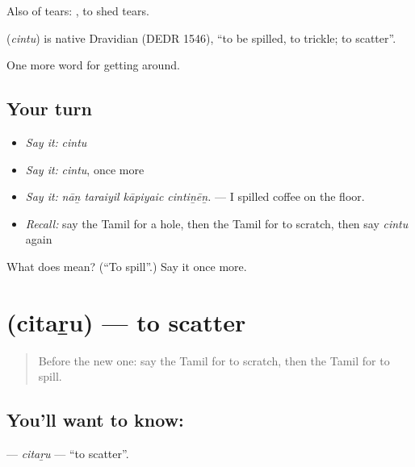 Also of tears:  , to shed tears.

\begin{cousinweb}
\textbf{} (\emph{cintu}) is native Dravidian (DEDR 1546), \textquotedblleft{}to be spilled, to trickle; to scatter\textquotedblright{}.
\end{cousinweb}

\begin{grammarlens}[title={What you've built}]
One more word for getting around.
\end{grammarlens}

\subsection*{Your turn}
\begin{itemize}
\raggedright
  \item \emph{Say it:} \emph{cintu}
  \item \emph{Say it:} \emph{cintu}, once more
  \item \emph{Say it:} \emph{nāṉ taraiyil kāpiyaic cintiṉēṉ.} — I spilled coffee on the floor.
  \item \emph{Recall:} say the Tamil for a hole, then the Tamil for to scratch, then say \emph{cintu} again
\end{itemize}

\begin{tcolorbox}[breakable,colback=teal!4,colframe=teal!35!black,title={Before you move on}]
What does  mean? (\textquotedblleft{}To spill\textquotedblright{}.) Say it once more.
\end{tcolorbox}
\section[\texorpdfstring{\ta{சிதறு} (citaṟu)}{சிதறு (citaṟu)}]{ (citaṟu) — to scatter}

\label{lesson:TA-C444-citaru}



\begin{quote}
Before the new one: say the Tamil for to scratch, then the Tamil for to spill.
\end{quote}

\subsection*{You'll want to know: }
\textbf{} — \emph{citaṟu} — \textquotedblleft{}to scatter\textquotedblright{}.

